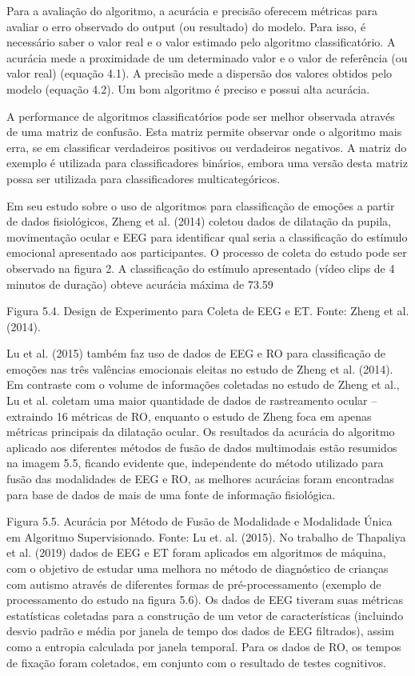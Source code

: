 Para a avaliação do algoritmo, a acurácia e precisão oferecem métricas para avaliar o erro observado do output (ou resultado) do modelo. 
Para isso, é necessário saber o valor real e o valor estimado pelo algoritmo classificatório. 
A acurácia mede a proximidade de um determinado valor e o valor de referência (ou valor real) (equação 4.1). 
A precisão mede a dispersão dos valores obtidos pelo modelo (equação 4.2). Um bom algoritmo é preciso e possui alta acurácia. 

A performance de algoritmos classificatórios pode ser 
melhor observada através de uma matriz de confusão. 
Esta matriz permite observar onde o algoritmo mais erra, se em 
classificar verdadeiros positivos ou verdadeiros negativos. 
A matriz do exemplo é utilizada para classificadores binários,
embora uma versão desta matriz possa ser utilizada para classificadores multicategóricos. 


Em seu estudo sobre o uso de algoritmos para classificação de emoções a partir de dados fisiológicos, Zheng et al. (2014) coletou dados de dilatação da pupila, movimentação ocular e EEG para identificar qual seria a classificação do estímulo emocional apresentado aos participantes. O processo de coleta do estudo pode ser observado na figura 2. A classificação do estímulo apresentado (vídeo clips de 4 minutos de duração) obteve acurácia máxima de 73.59%
 
Figura 5.4. Design de Experimento para Coleta de EEG e ET. Fonte: Zheng et al. (2014).

Lu et al. (2015) também faz uso de dados de EEG e RO para classificação de emoções nas três valências emocionais eleitas no estudo de Zheng et al. (2014). Em contraste com o volume de informações coletadas no estudo de Zheng et al., Lu et al. coletam uma maior quantidade de dados de rastreamento ocular – extraindo 16 métricas de RO, enquanto o estudo de Zheng foca em apenas métricas principais da dilatação ocular. Os resultados da acurácia do algoritmo aplicado aos diferentes métodos de fusão de dados multimodais estão resumidos na imagem 5.5, ficando evidente que, independente do método utilizado para fusão das modalidades de EEG e RO, as melhores acurácias foram encontradas para base de dados de mais de uma fonte de informação fisiológica. 
 
Figura 5.5. Acurácia por Método de Fusão de Modalidade e Modalidade Única em Algoritmo Supervisionado. Fonte: Lu et. al. (2015).
No trabalho de Thapaliya et al. (2019) dados de EEG e ET foram aplicados em algoritmos de máquina, com o objetivo de estudar uma melhora no método de diagnóstico de crianças com autismo através de diferentes formas de pré-processamento (exemplo de processamento do estudo na figura 5.6). Os dados de EEG tiveram suas métricas estatísticas coletadas para a construção de um vetor de características (incluindo desvio padrão e média por janela de tempo dos dados de EEG filtrados), assim como a entropia calculada por janela temporal. Para os dados de RO, os tempos de fixação foram coletados, em conjunto com o resultado de testes cognitivos. 
 
